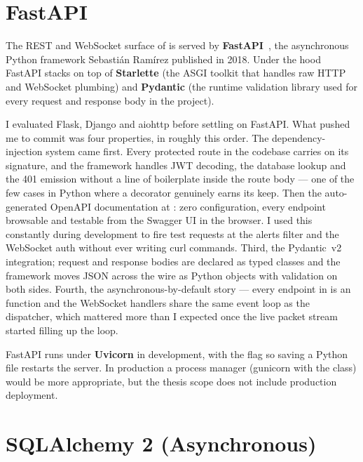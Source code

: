 \section{FastAPI}
\label{sec:tech-fastapi}

The REST and WebSocket surface of \nidsname{} is served by
\textbf{FastAPI}~\cite{ramirez2022fastapi}, the asynchronous Python
framework Sebastián Ramírez published in 2018. Under the hood
FastAPI stacks on top of \textbf{Starlette} (the ASGI toolkit
that handles raw HTTP and WebSocket plumbing) and
\textbf{Pydantic} (the runtime validation library used for every
request and response body in the project).

I evaluated Flask, Django and aiohttp before settling on FastAPI.
What pushed me to commit was four properties, in roughly this
order. The dependency-injection system came first. Every
protected route in the codebase carries
 on its signature, and the
framework handles JWT decoding, the database lookup and the
401 emission without a line of boilerplate inside the route
body --- one of the few cases in Python where a decorator
genuinely earns its keep. Then the auto-generated OpenAPI
documentation at : zero configuration, every endpoint
browsable and testable from the Swagger UI in the browser. I used
this constantly during development to fire test requests at
the alerts filter and the WebSocket auth without ever writing
curl commands. Third, the Pydantic~v2 integration; request and
response bodies are declared as typed classes and the framework
moves JSON across the wire as Python objects with validation on
both sides. Fourth, the asynchronous-by-default story --- every
endpoint in \nidsname{} is an  function and the
WebSocket handlers share the same event loop as the dispatcher,
which mattered more than I expected once the live packet stream
started filling up the loop.

FastAPI runs under \textbf{Uvicorn} in development, with the
 flag so saving a Python file restarts the server. In
production a process manager (gunicorn with the
 class) would be more appropriate,
but the thesis scope does not include production deployment.

\section{SQLAlchemy 2 (Asynchronous)}
\label{sec:tech-sqlalchemy}

